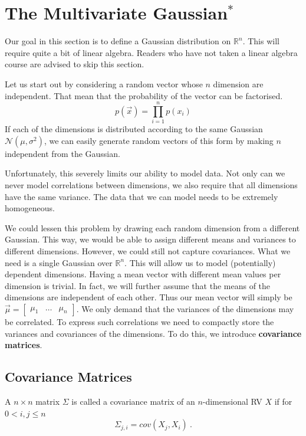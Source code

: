 \section{The Multivariate Gaussian$ ^{*} $}\label{sec:mvGauss}

Our goal in this section is to define a Gaussian distribution on $ \mathbb{R}^{n} $. This will require quite a bit of linear algebra. Readers who have not taken
a linear algebra course are advised to skip this section.

Let us start out by considering a random vector whose $ n $ dimension are independent. That mean that the probability of the vector can be factorised.
\begin{equation}
p(\vec{x}) = \prod_{i=1}^{n} p(x_{i})
\end{equation}
If each of the dimensions is distributed according to the same Gaussian $ \mathcal{N}(\mu, \sigma^{2}) $, we can easily generate random vectors of this form 
by making $ n $ independent from the Gaussian.

Unfortunately, this severely limits our ability to model data. Not only can we never model correlations between dimensions, we also require that all dimensions
have the same variance. The data that we can model needs to be extremely homogeneous.

We could lessen this problem by drawing each random dimension from a different Gaussian. This way, we would be able to assign different means and variances to different
dimensions. However, we could still not capture covariances. What we need is a single Gaussian over $ \mathbb{R}^{n} $. This will allow us to model (potentially) dependent
dimensions. Having a mean vector with different mean values per dimension is trivial. In fact, we will further assume that the means of the dimensions are independent of
each other. Thus our mean vector will simply be 
$ \vec{\mu} = \begin{bmatrix}
\mu_{1} & \ldots & \mu_{n}
\end{bmatrix} $. We only demand that the variances of the dimensions may be correlated. To express such correlations we need to compactly store the variances and 
covariances of the dimensions. To do this, we introduce \textbf{covariance matrices}.

\subsection{Covariance Matrices}

\begin{Definition}
A $ n \times n $ matrix $ \Sigma $ is called a covariance matrix of an $ n $-dimensional RV $ X $ if for $ 0 < i,j \leq n $ 
$$ \Sigma_{j,i} = cov(X_{j}, X_{i}) \ . $$
\end{Definition}

